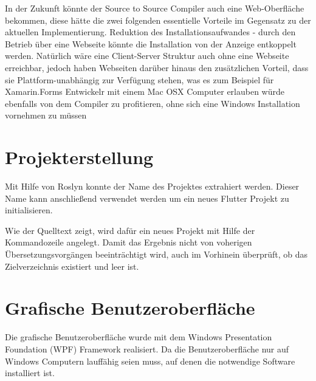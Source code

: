 In der Zukunft könnte der Source to Source Compiler auch eine Web-Oberfläche bekommen,  diese hätte die zwei folgenden essentielle Vorteile im Gegensatz zu der aktuellen Implementierung.  Reduktion des Installationsaufwandes - durch den Betrieb über eine Webseite könnte die Installation von der Anzeige entkoppelt werden.  Natürlich wäre eine Client-Server Struktur auch ohne eine Webseite erreichbar,  jedoch haben Webseiten darüber hinaus den zusätzlichen Vorteil,  dass sie Plattform-unabhängig zur Verfügung stehen,  was es zum Beispiel für Xamarin.Forms Entwickelr mit einem Mac OSX Computer erlauben würde ebenfalls von dem Compiler zu profitieren, ohne sich eine Windows Installation vornehmen zu müssen

\section{Projekterstellung}
Mit Hilfe von Roslyn konnte der Name des Projektes extrahiert werden.  Dieser Name kann anschließend verwendet werden um ein neues Flutter Projekt zu initialisieren.  

Wie der Quelltext zeigt,  wird dafür ein neues Projekt mit Hilfe der Kommandozeile angelegt.  Damit das Ergebnis nicht von voherigen Übersetzungsvorgängen beeinträchtigt wird,  auch im Vorhinein überprüft,  ob das Zielverzeichnis existiert und leer ist. 


\section{Grafische Benutzeroberfläche}
Die grafische Benutzeroberfläche wurde mit dem Windows Presentation Foundation (WPF) Framework realisiert.  Da die Benutzeroberfläche nur auf Windows Computern lauffähig seien muss,  auf denen die notwendige Software installiert ist. 
